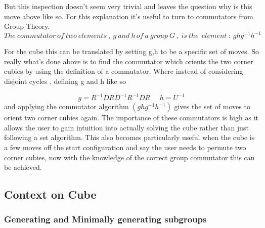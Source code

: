 \documentclass{article}
\begin{document}
But this inspection doesn't seem very trivial and leaves the question why is this move above like so. For this explanation it's useful to turn to commutators from Group Theory. 
\begin{equation}
The\ commutator\ of\ two\ elements\ ,\ g\ and\ h\, of\ a\ group\ G\ ,\ is\ the\ \ element\ :\ ghg^{-1}h^{-1}
\end{equation}

For the cube this can be translated by setting g,h to be a specific set of moves. So really what's done above is to find the commutator which orients the two corner cubies by using the definition of a commutator. Where instead of considering disjoint cycles , defining g and h like so

\begin{equation}\label{orient}
	g = R^{-1}DRD^{-1}R^{-1}DR\ \ \ \ \ \ 
    h = U^{-1}
\end{equation}
and applying the commutator algorithm $(ghg^{-1}h^{-1})$ gives the set of moves to orient two corner cubies again. The importance of these commutators is high as it allows the user to gain intuition into actually solving the cube rather than just following a set algorithm. This also becomes particularly useful when the cube is a few moves off the start configuration and say the user needs to permute two corner cubies, now with the knowledge of the correct group commutator this can be achieved.



\subsection*{Context on Cube}
\subsubsection*{Generating and Minimally generating subgroups}
\end{document}
